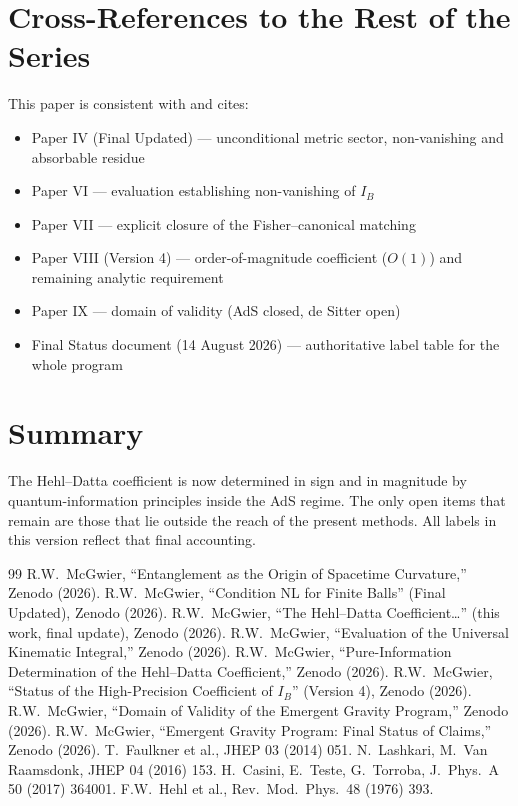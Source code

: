 \documentclass[11pt]{article}
\begin{document}
\section{Cross-References to the Rest of the Series}
This paper is consistent with and cites:
\begin{itemize}[leftmargin=1.4em]
\item Paper IV (Final Updated) --- unconditional metric sector, non-vanishing and absorbable residue
\item Paper VI --- evaluation establishing non-vanishing of $I_B$
\item Paper VII --- explicit closure of the Fisher--canonical matching
\item Paper VIII (Version 4) --- order-of-magnitude coefficient ($O(1)$) and remaining analytic requirement
\item Paper IX --- domain of validity (AdS closed, de Sitter open)
\item Final Status document (14 August 2026) --- authoritative label table for the whole program
\end{itemize}

\section{Summary}
The Hehl--Datta coefficient is now determined in sign and in magnitude by
quantum-information principles inside the AdS regime. The only open items
that remain are those that lie outside the reach of the present methods.
All labels in this version reflect that final accounting.

\begin{thebibliography}{99}
 R.W.\ McGwier, ``Entanglement as the Origin of Spacetime Curvature,'' Zenodo (2026).
 R.W.\ McGwier, ``Condition NL for Finite Balls'' (Final Updated), Zenodo (2026).
 R.W.\ McGwier, ``The Hehl--Datta Coefficient\ldots'' (this work, final update), Zenodo (2026).
 R.W.\ McGwier, ``Evaluation of the Universal Kinematic Integral,'' Zenodo (2026).
 R.W.\ McGwier, ``Pure-Information Determination of the Hehl--Datta Coefficient,'' Zenodo (2026).
 R.W.\ McGwier, ``Status of the High-Precision Coefficient of $I_B$'' (Version 4), Zenodo (2026).
 R.W.\ McGwier, ``Domain of Validity of the Emergent Gravity Program,'' Zenodo (2026).
 R.W.\ McGwier, ``Emergent Gravity Program: Final Status of Claims,'' Zenodo (2026).
 T.\ Faulkner et al., JHEP 03 (2014) 051.
 N.\ Lashkari, M.\ Van Raamsdonk, JHEP 04 (2016) 153.
 H.\ Casini, E.\ Teste, G.\ Torroba, J.\ Phys.\ A 50 (2017) 364001.
 F.W.\ Hehl et al., Rev.\ Mod.\ Phys.\ 48 (1976) 393.
\end{thebibliography}
\end{document}
